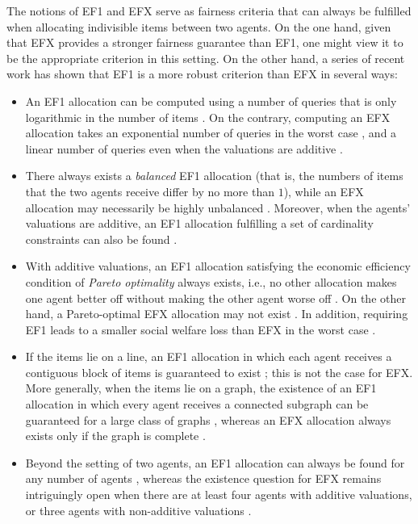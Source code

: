 \documentclass[11pt]{scrartcl}
\theoremstyle{definition}
\begin{document}
The notions of EF1 and EFX serve as fairness criteria that can always be fulfilled when allocating indivisible items between two agents.
On the one hand, given that EFX provides a stronger fairness guarantee than EF1, one might view it to be the appropriate criterion in this setting.
On the other hand, a series of recent work has shown that EF1 is a more robust criterion than EFX in several ways:
\begin{itemize}
\item An EF1 allocation can be computed using a number of queries that is only logarithmic in the number of items \citep{OhPrSu19}.
On the contrary, computing an EFX allocation takes an exponential number of queries in the worst case \citep{PlautRo18}, and a linear number of queries even when the valuations are additive \citep{OhPrSu19}.
\item There always exists a \emph{balanced} EF1 allocation (that is, the numbers of items that the two agents receive differ by no more than $1$), while an EFX allocation may necessarily be highly unbalanced \citep{KyropoulouSuVo19}.
Moreover, when the agents' valuations are additive, an EF1 allocation fulfilling a set of cardinality constraints can also be found \citep{BiswasBa18}.
\item With additive valuations, an EF1 allocation satisfying the economic efficiency condition of \emph{Pareto optimality} always exists, i.e., no other allocation makes one agent better off without making the other agent worse off \citep{BarmanKrVa18,CaragiannisKuMo16}. On the other hand, a Pareto-optimal EFX allocation may not exist \citep{PlautRo18}.
In addition, requiring EF1 leads to a smaller social welfare loss than EFX in the worst case \citep{BeiLuMa19}.
\item If the items lie on a line, an EF1 allocation in which each agent receives a contiguous block of items is guaranteed to exist \citep{BiloCaFl19,Suksompong19}; this is not the case for EFX.
More generally, when the items lie on a graph, the existence of an EF1 allocation in which every agent receives a connected subgraph can be guaranteed for a large class of graphs \citep{BiloCaFl19}, whereas an EFX allocation always exists only if the graph is complete \citep{BeiIgLu19}.
\item Beyond the setting of two agents, an EF1 allocation can always be found for any number of agents \citep{LiptonMaMo04}, whereas the existence question for EFX remains intriguingly open when there are at least four agents with additive valuations, or three agents with non-additive valuations \citep{PlautRo18,CaragiannisKuMo16,AmanatidisBiFi20,AmanatidisNtMa20,ChaudhuryGaMe20}.
\end{itemize}
\end{document}
